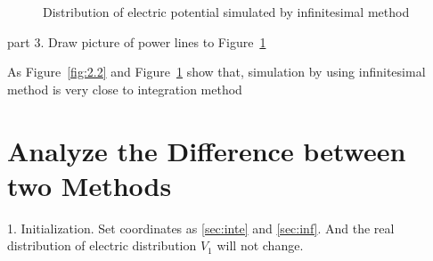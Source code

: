 \documentclass[10pt, journal, final]{IEEEtran}
\begin{document}
\begin{figure}[htbp]
    \centering

    \caption{Distribution of electric potential simulated by infinitesimal method}
    \label{fig:2.3}
\end{figure}

part 3. Draw picture of power lines to Figure~\ref{fig:2.3}


As Figure~\ref{fig:2.2} and Figure~\ref{fig:2.3} show that,
simulation by using infinitesimal method is very close to integration method

\section{
  Analyze the Difference between two Methods
 }
\label{sec:diff}

1. Initialization. Set coordinates as \ref{sec:inte} and \ref{sec:inf}.
And the real distribution of electric distribution $V_1$ will not change.

\end{document}
